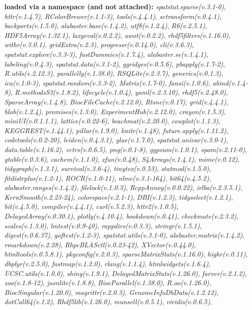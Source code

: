 \documentclass[
]{book}
\begin{document}
\textbf{loaded via a namespace (and not attached):}
\emph{spatstat.sparse(v.3.1-0)}, \emph{httr(v.1.4.7)}, \emph{RColorBrewer(v.1.1-3)}, \emph{tools(v.4.4.1)}, \emph{sctransform(v.0.4.1)}, \emph{backports(v.1.5.0)}, \emph{alabaster.base(v.1.4.2)}, \emph{utf8(v.1.2.4)}, \emph{R6(v.2.5.1)}, \emph{HDF5Array(v.1.32.1)}, \emph{lazyeval(v.0.2.2)}, \emph{uwot(v.0.2.2)}, \emph{rhdf5filters(v.1.16.0)}, \emph{withr(v.3.0.1)}, \emph{gridExtra(v.2.3)}, \emph{progressr(v.0.14.0)}, \emph{cli(v.3.6.3)}, \emph{spatstat.explore(v.3.3-3)}, \emph{fastDummies(v.1.7.4)}, \emph{alabaster.se(v.1.4.1)}, \emph{labeling(v.0.4.3)}, \emph{spatstat.data(v.3.1-2)}, \emph{ggridges(v.0.5.6)}, \emph{pbapply(v.1.7-2)}, \emph{R.utils(v.2.12.3)}, \emph{parallelly(v.1.38.0)}, \emph{RSQLite(v.2.3.7)}, \emph{generics(v.0.1.3)}, \emph{ica(v.1.0-3)}, \emph{spatstat.random(v.3.3-2)}, \emph{Matrix(v.1.7-0)}, \emph{fansi(v.1.0.6)}, \emph{abind(v.1.4-8)}, \emph{R.methodsS3(v.1.8.2)}, \emph{lifecycle(v.1.0.4)}, \emph{yaml(v.2.3.10)}, \emph{rhdf5(v.2.48.0)}, \emph{SparseArray(v.1.4.8)}, \emph{BiocFileCache(v.2.12.0)}, \emph{Rtsne(v.0.17)}, \emph{grid(v.4.4.1)}, \emph{blob(v.1.2.4)}, \emph{promises(v.1.3.0)}, \emph{ExperimentHub(v.2.12.0)}, \emph{crayon(v.1.5.3)}, \emph{miniUI(v.0.1.1.1)}, \emph{lattice(v.0.22-6)}, \emph{beachmat(v.2.20.0)}, \emph{cowplot(v.1.1.3)}, \emph{KEGGREST(v.1.44.1)}, \emph{pillar(v.1.9.0)}, \emph{knitr(v.1.48)}, \emph{future.apply(v.1.11.2)}, \emph{codetools(v.0.2-20)}, \emph{leiden(v.0.4.3.1)}, \emph{glue(v.1.7.0)}, \emph{spatstat.univar(v.3.0-1)}, \emph{data.table(v.1.16.2)}, \emph{vctrs(v.0.6.5)}, \emph{png(v.0.1-8)}, \emph{gypsum(v.1.0.1)}, \emph{spam(v.2.11-0)}, \emph{gtable(v.0.3.6)}, \emph{cachem(v.1.1.0)}, \emph{xfun(v.0.48)}, \emph{S4Arrays(v.1.4.1)}, \emph{mime(v.0.12)}, \emph{tidygraph(v.1.3.1)}, \emph{survival(v.3.6-4)}, \emph{tinytex(v.0.53)}, \emph{statmod(v.1.5.0)}, \emph{fitdistrplus(v.1.2-1)}, \emph{ROCR(v.1.0-11)}, \emph{nlme(v.3.1-164)}, \emph{bit64(v.4.5.2)}, \emph{alabaster.ranges(v.1.4.2)}, \emph{filelock(v.1.0.3)}, \emph{RcppAnnoy(v.0.0.22)}, \emph{irlba(v.2.3.5.1)}, \emph{KernSmooth(v.2.23-24)}, \emph{colorspace(v.2.1-1)}, \emph{DBI(v.1.2.3)}, \emph{tidyselect(v.1.2.1)}, \emph{bit(v.4.5.0)}, \emph{compiler(v.4.4.1)}, \emph{curl(v.5.2.3)}, \emph{httr2(v.1.0.5)}, \emph{DelayedArray(v.0.30.1)}, \emph{plotly(v.4.10.4)}, \emph{bookdown(v.0.41)}, \emph{checkmate(v.2.3.2)}, \emph{scales(v.1.3.0)}, \emph{lmtest(v.0.9-40)}, \emph{rappdirs(v.0.3.3)}, \emph{stringr(v.1.5.1)}, \emph{digest(v.0.6.37)}, \emph{goftest(v.1.2-3)}, \emph{spatstat.utils(v.3.1-0)}, \emph{alabaster.matrix(v.1.4.2)}, \emph{rmarkdown(v.2.28)}, \emph{RhpcBLASctl(v.0.23-42)}, \emph{XVector(v.0.44.0)}, \emph{htmltools(v.0.5.8.1)}, \emph{pkgconfig(v.2.0.3)}, \emph{sparseMatrixStats(v.1.16.0)}, \emph{highr(v.0.11)}, \emph{dbplyr(v.2.5.0)}, \emph{fastmap(v.1.2.0)}, \emph{rlang(v.1.1.4)}, \emph{htmlwidgets(v.1.6.4)}, \emph{UCSC.utils(v.1.0.0)}, \emph{shiny(v.1.9.1)}, \emph{DelayedMatrixStats(v.1.26.0)}, \emph{farver(v.2.1.2)}, \emph{zoo(v.1.8-12)}, \emph{jsonlite(v.1.8.8)}, \emph{BiocParallel(v.1.38.0)}, \emph{R.oo(v.1.26.0)}, \emph{BiocSingular(v.1.20.0)}, \emph{magrittr(v.2.0.3)}, \emph{GenomeInfoDbData(v.1.2.12)}, \emph{dotCall64(v.1.2)}, \emph{Rhdf5lib(v.1.26.0)}, \emph{munsell(v.0.5.1)}, \emph{viridis(v.0.6.5)}, 
\end{document}
